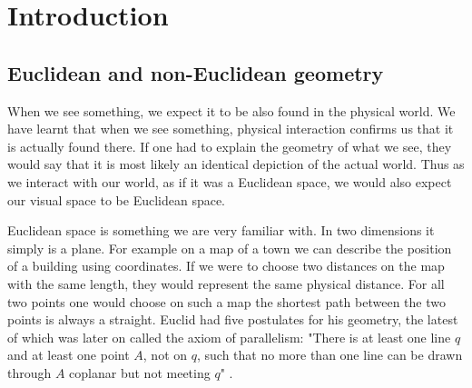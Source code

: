 
\chapter{Introduction}
\label{Introduction}

\section{Euclidean and non-Euclidean geometry} 
When we see something, we expect it to be also found in the physical world. We have learnt that when we see something, physical interaction confirms us that it is actually found there. If one had to explain  the geometry of what we see, they would say that it is most likely an identical depiction of the actual world. Thus as we interact with our world, as if it was a Euclidean space, we would also expect our visual space to be Euclidean space.

Euclidean space is something we are very familiar with. In two dimensions it simply is a plane. For example on a map of a town we can describe the position of a building using coordinates. If we were to choose two distances on the map with the same length, they would represent the same physical distance. %
For all two points one would choose on such a map the shortest path between the two points is always a straight. Euclid had five postulates for his geometry, the latest of which was later on called the axiom of parallelism: "There is at least one line $q$ and at least one point $A$, not on $q$, such that no more than one line can be drawn through $A$ coplanar but not meeting $q$" \cite[p.~186]{Coxeter.1998}.

